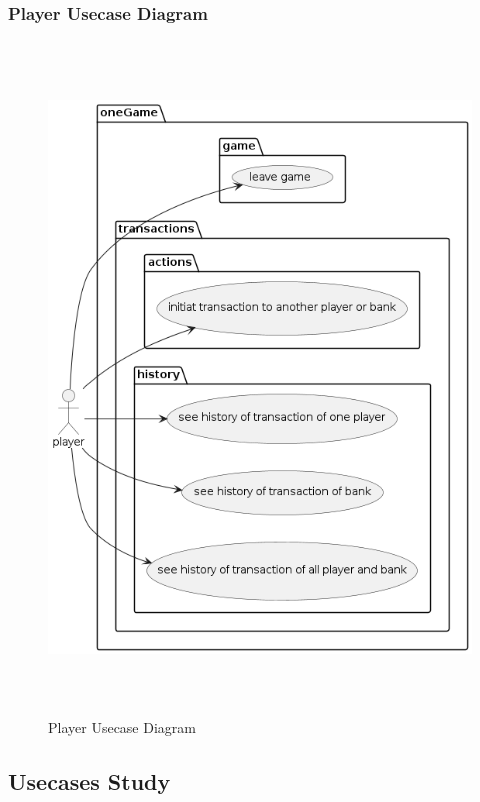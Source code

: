 \documentclass{article}
\begin{document}
\subsubsection{Player Usecase Diagram}
\begin{figure}[H]
	\centering
	\includegraphics[height=7in]{../thesis_tex/assets/diagrams/player_ucd.png}
	\caption{Player Usecase Diagram}
\end{figure}
\cleardoublepage

\subsection{Usecases Study}
\end{document}
